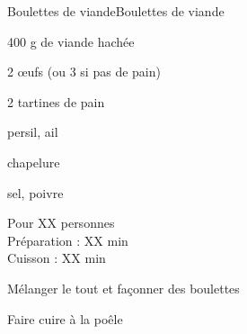 \begin{recette}{Boulettes de viande}{Boulettes de viande}

\begin{ingredients}
400 g de viande hachée\par
2 œufs (ou 3 si pas de pain)\par
2 tartines de pain\par
persil, ail\par
chapelure\par
sel, poivre\par
\end{ingredients}

\begin{infos}
Pour XX personnes\\
Préparation : XX min\\
Cuisson : XX min\\
\end{infos}

\begin{etapes}
\item Mélanger le tout et façonner des boulettes
\item Faire cuire à la poêle
\end{etapes}

\end{recette}